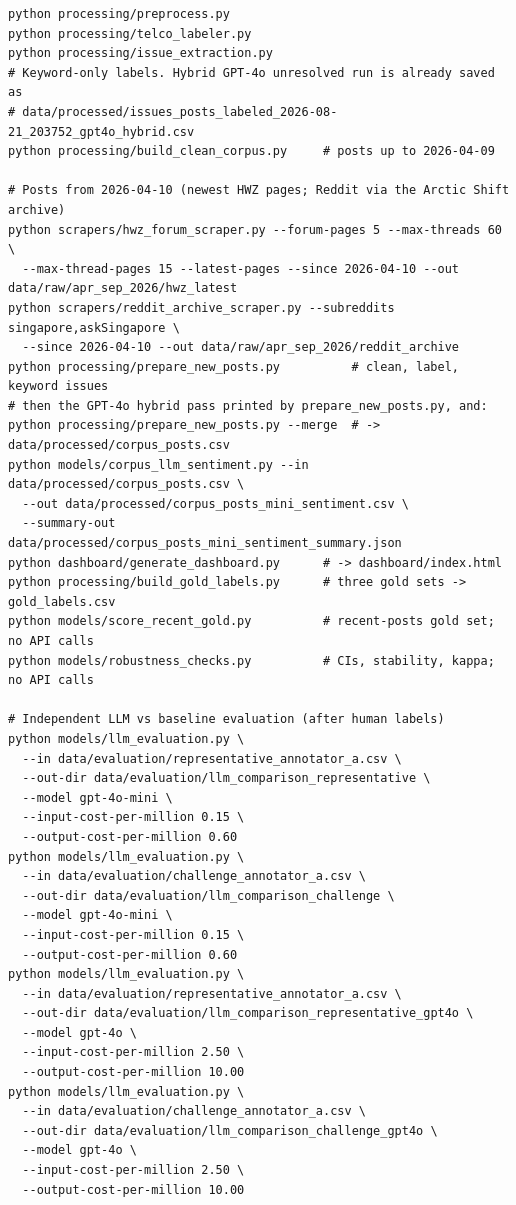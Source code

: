 \documentclass[11pt,a4paper]{article}
\begin{document}
\begin{verbatim}
python processing/preprocess.py
python processing/telco_labeler.py
python processing/issue_extraction.py
# Keyword-only labels. Hybrid GPT-4o unresolved run is already saved as
# data/processed/issues_posts_labeled_2026-08-21_203752_gpt4o_hybrid.csv
python processing/build_clean_corpus.py     # posts up to 2026-04-09

# Posts from 2026-04-10 (newest HWZ pages; Reddit via the Arctic Shift archive)
python scrapers/hwz_forum_scraper.py --forum-pages 5 --max-threads 60 \
  --max-thread-pages 15 --latest-pages --since 2026-04-10 --out data/raw/apr_sep_2026/hwz_latest
python scrapers/reddit_archive_scraper.py --subreddits singapore,askSingapore \
  --since 2026-04-10 --out data/raw/apr_sep_2026/reddit_archive
python processing/prepare_new_posts.py          # clean, label, keyword issues
# then the GPT-4o hybrid pass printed by prepare_new_posts.py, and:
python processing/prepare_new_posts.py --merge  # -> data/processed/corpus_posts.csv
python models/corpus_llm_sentiment.py --in data/processed/corpus_posts.csv \
  --out data/processed/corpus_posts_mini_sentiment.csv \
  --summary-out data/processed/corpus_posts_mini_sentiment_summary.json
python dashboard/generate_dashboard.py      # -> dashboard/index.html
python processing/build_gold_labels.py      # three gold sets -> gold_labels.csv
python models/score_recent_gold.py          # recent-posts gold set; no API calls
python models/robustness_checks.py          # CIs, stability, kappa; no API calls

# Independent LLM vs baseline evaluation (after human labels)
python models/llm_evaluation.py \
  --in data/evaluation/representative_annotator_a.csv \
  --out-dir data/evaluation/llm_comparison_representative \
  --model gpt-4o-mini \
  --input-cost-per-million 0.15 \
  --output-cost-per-million 0.60
python models/llm_evaluation.py \
  --in data/evaluation/challenge_annotator_a.csv \
  --out-dir data/evaluation/llm_comparison_challenge \
  --model gpt-4o-mini \
  --input-cost-per-million 0.15 \
  --output-cost-per-million 0.60
python models/llm_evaluation.py \
  --in data/evaluation/representative_annotator_a.csv \
  --out-dir data/evaluation/llm_comparison_representative_gpt4o \
  --model gpt-4o \
  --input-cost-per-million 2.50 \
  --output-cost-per-million 10.00
python models/llm_evaluation.py \
  --in data/evaluation/challenge_annotator_a.csv \
  --out-dir data/evaluation/llm_comparison_challenge_gpt4o \
  --model gpt-4o \
  --input-cost-per-million 2.50 \
  --output-cost-per-million 10.00
\end{verbatim}
\end{document}
